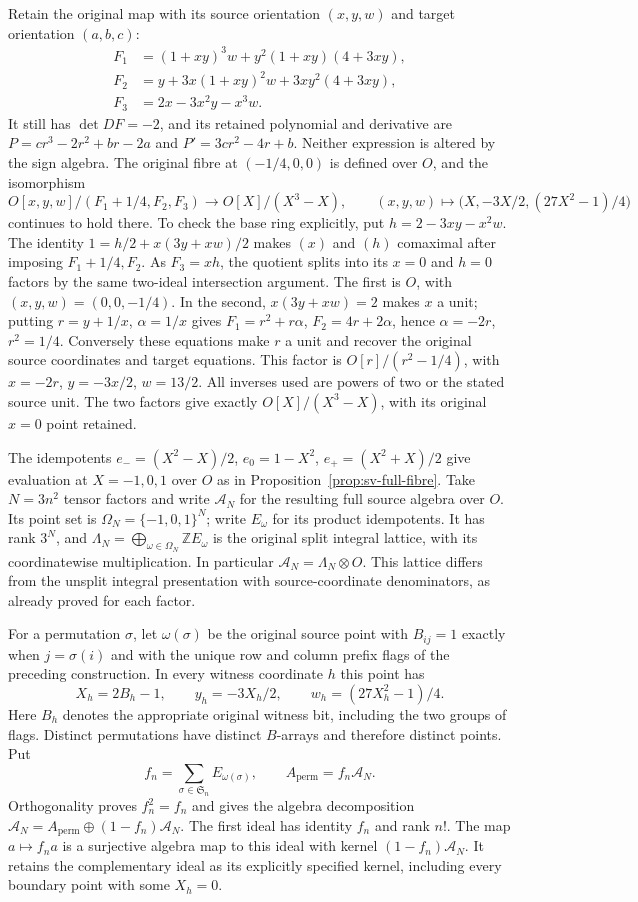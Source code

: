 Retain the original map with its source orientation $(x,y,w)$ and
target orientation $(a,b,c)$:
\begin{align*}
 F_1&=(1+xy)^3w+y^2(1+xy)(4+3xy),\\
 F_2&=y+3x(1+xy)^2w+3xy^2(4+3xy),\\
 F_3&=2x-3x^2y-x^3w.
\end{align*}
It still has $\det DF=-2$, and its retained polynomial and derivative
are $P=cr^3-2r^2+br-2a$ and $P'=3cr^2-4r+b$. Neither expression
is altered by the sign algebra. The original fibre at $(-1/4,0,0)$
is defined over $O$, and the isomorphism
\[
 O[x,y,w]/(F_1+1/4,F_2,F_3)
 \longrightarrow O[X]/(X^3-X),\qquad
 (x,y,w)\longmapsto\bigl(X,-3X/2,(27X^2-1)/4\bigr)
\]
continues to hold there. To check the base ring explicitly, put
$h=2-3xy-x^2w$. The identity
$1=h/2+x(3y+xw)/2$ makes $(x)$ and $(h)$ comaximal after imposing
$F_1+1/4,F_2$. As $F_3=xh$, the quotient splits into its $x=0$
and $h=0$ factors by the same two-ideal intersection argument.
The first is $O$, with $(x,y,w)=(0,0,-1/4)$. In the second,
$x(3y+xw)=2$ makes $x$ a unit; putting $r=y+1/x$, $\alpha=1/x$
gives $F_1=r^2+r\alpha$, $F_2=4r+2\alpha$, hence
$\alpha=-2r$, $r^2=1/4$. Conversely these equations make $r$
a unit and recover the original source coordinates and target
equations. This factor is $O[r]/(r^2-1/4)$, with
$x=-2r$, $y=-3x/2$, $w=13/2$. All inverses used are powers of
two or the stated source unit. The two factors give exactly
$O[X]/(X^3-X)$, with its original $x=0$ point retained.

The idempotents $e_-=(X^2-X)/2$, $e_0=1-X^2$,
$e_+=(X^2+X)/2$ give evaluation at $X=-1,0,1$ over $O$ as
in Proposition~\ref{prop:sv-full-fibre}. Take $N=3n^2$ tensor
factors and write $\mathcal A_N$ for the resulting full source
algebra over $O$. Its point set is $\Omega_N=\{-1,0,1\}^N$;
write $E_\omega$ for its product idempotents. It has rank $3^N$,
and $\Lambda_N=\bigoplus_{\omega\in\Omega_N}\mathbb Z E_\omega$
is the original split integral lattice, with its coordinatewise
multiplication. In particular $\mathcal A_N=\Lambda_N\otimes O$.
This lattice differs from the unsplit integral presentation with
source-coordinate denominators, as already proved for each factor.

For a permutation $\sigma$, let $\omega(\sigma)$ be the original
source point with $B_{ij}=1$ exactly when $j=\sigma(i)$ and with
the unique row and column prefix flags of the preceding construction.
In every witness coordinate $h$ this point has
\[
 X_h=2B_h-1,\qquad y_h=-3X_h/2,\qquad
 w_h=(27X_h^2-1)/4.
\]
Here $B_h$ denotes the appropriate original witness bit, including
the two groups of flags. Distinct permutations have distinct
$B$-arrays and therefore distinct points. Put
\[
 f_n=\sum_{\sigma\in\mathfrak S_n}E_{\omega(\sigma)},
 \qquad A_{\mathrm{perm}}=f_n\mathcal A_N.
\]
Orthogonality proves $f_n^2=f_n$ and gives the algebra decomposition
$\mathcal A_N=A_{\mathrm{perm}}\oplus(1-f_n)\mathcal A_N$.
The first ideal has identity $f_n$ and rank $n!$. The map
$a\mapsto f_na$ is a surjective algebra map to this ideal with
kernel $(1-f_n)\mathcal A_N$. It retains the complementary ideal
as its explicitly specified kernel, including every boundary point
with some $X_h=0$.

